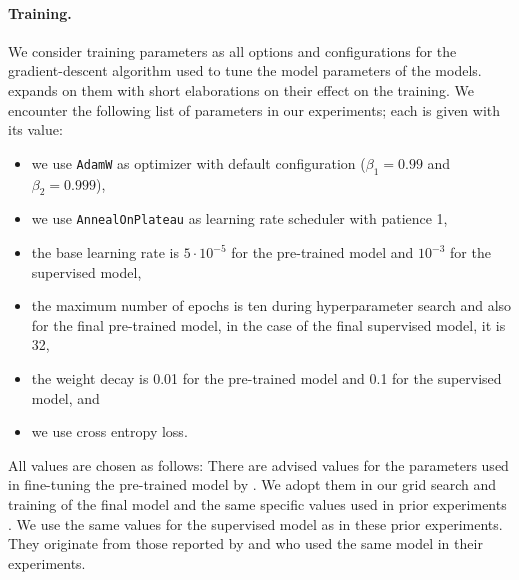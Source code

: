 \documentclass[../../document.tex]{subfiles}
\begin{document}
    \paragraph*{Training.}
    We consider training parameters as all options and configurations for the gradient-descent algorithm  used to tune the model parameters of the  models.
     expands on them with short elaborations on their effect on the training.
    We encounter the following list of parameters in our experiments; each is given with its value:
    \begin{itemize}
        \item we use \texttt{AdamW} as optimizer with default configuration ($\beta_1 = 0.99$ and $\beta_2 = 0.999$),
        \item we use \texttt{AnnealOnPlateau} as learning rate scheduler with patience 1,
        \item the base learning rate is $5\cdot 10^{-5}$ for the pre-trained model and $10^{-3}$ for the supervised model,
        \item the maximum number of epochs is ten during hyperparameter search and also for the final pre-trained model, in the case of the final supervised model, it is 32,
        \item the weight decay is 0.01 for the pre-trained model and 0.1 for the supervised model, and
        \item we use cross entropy loss.
    \end{itemize}
    All values are chosen as follows:
    There are advised values for the parameters used in fine-tuning the pre-trained model by \citet{Devlin2019}.
    We adopt them in our grid search and training of the final model and the same specific values used in prior experiments \citep[cf.\@][]{Rup22}.
    We use the same values for the supervised model as in these prior experiments.
    They originate from those reported by \citet{Cor20} and \citet{StaSte20} who used the same model in their experiments.
\end{document}
